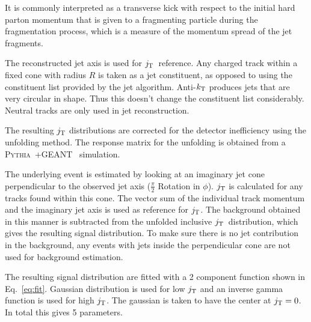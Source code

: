 It is commonly interpreted as a transverse kick with respect to the initial hard parton momentum that is given to a fragmenting particle during the fragmentation process, which is a measure of the momentum spread of the jet fragments.

The reconstructed jet axis is used for $j_{\rm T}$ reference. Any charged track within a fixed cone with radius $R$ is taken as a jet constituent, as opposed to using the constituent list provided by the jet algorithm. Anti-$k_{\rm T}$ produces jets that are very circular in shape. Thus this doesn't change the constituent list considerably. Neutral tracks are only used in jet reconstruction.

The resulting $j_{\rm T}$ distributions are corrected for the detector inefficiency using the unfolding method. The response matrix for the unfolding is obtained from a \textsc{Pythia}~\cite{introPythia81}+GEANT~\cite{Agostinelli:2002hh,Asai:2015xno} simulation.


The underlying event is estimated by looking at an imaginary jet cone perpendicular to the observed jet axis ($\frac{\pi}{2}$ Rotation in $\phi$). $j_{\rm T}$ is calculated for any tracks found within this cone. The vector sum of the individual track momentum and the imaginary jet axis is used as reference for $j_{\rm T}$. The background obtained in this manner is subtracted from the unfolded inclusive $j_{\rm T}$ distribution, which gives the resulting signal distribution. To make sure there is no jet contribution in the background, any events with jets inside the perpendicular cone are not used for background estimation.



The resulting signal distribution are fitted with a 2 component function shown in Eq.~\ref{eq:fit}. Gaussian distribution is used for low $j_{\rm T}$ and an inverse gamma function is used for high $j_{\rm T}$. The gaussian is taken to have the center at $j_{\rm T} = 0$. In total this gives 5 parameters. ~\cite{ALICEjt}

